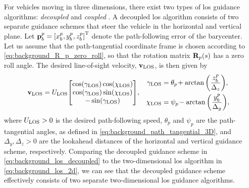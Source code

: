 For vehicles moving in three dimensions, there exist two types of \gls{los} guidance algorithms: \emph{decoupled} \cite{caharija_path_2012,abdurahman_switching_2019} and \emph{coupled} \cite{breivik_principles_2005,yu_nonlinear_2017,yu_LOS_2020}.
A decoupled \gls{los} algorithm consists of two separate guidance schemes that steer the vehicle in the horizontal and vertical plane.
Let $\mathbf{p}_b^p = \left[x_b^p, y_b^p, z_b^p\right]^{\mathrm{T}}$ denote the path-following error of the barycenter.
Let us assume that the path-tangential coordinate frame is chosen according to \eqref{eq:background_R_p_zero_roll}, so that the rotation matrix $\mathbf{R}_p(s)$ has a zero roll angle.
The desired line-of-sight velocity, $\mathbf{v}_{\rm LOS}$, is then given by
\begin{align}
    \mathbf{v}_{\rm LOS} &= U_{\rm LOS} \!
    \begin{bmatrix}
        \cos(\gamma_{\rm LOS}) \cos(\chi_{\rm LOS}) \\
        \cos(\gamma_{\rm LOS}) \sin(\chi_{\rm LOS}) \\
        -\sin(\gamma_{\rm LOS})
    \end{bmatrix}\!, &
    \begin{split}
        \gamma_{\rm LOS} &= \theta_{p\!} + \arctan\left(\frac{z_b^p}{\Delta_z}\right)\!, \\
        \chi_{\rm LOS} &= \psi_{p\!} - \arctan\left(\frac{y_b^p}{\Delta_y}\right)\!, \\
    \end{split}
    \label{eq:background_los_decoupled}
\end{align}
where $U_{\rm LOS} > 0$ is the desired path-following speed, $\theta_p$ and $\psi_p$ are the path-tangential angles, as defined in \eqref{eq:background_path_tangential_3D}, and $\Delta_y, \Delta_z > 0$ are the lookahead distances of the horizontal and vertical guidance scheme, respectively.
Comparing the decoupled guidance scheme in \eqref{eq:background_los_decoupled} to the two-dimensional \gls{los} algorithm in \eqref{eq:background_los_2d}, we can see that the decoupled guidance scheme effectively consists of two separate two-dimensional \gls{los} guidance algorithms.

